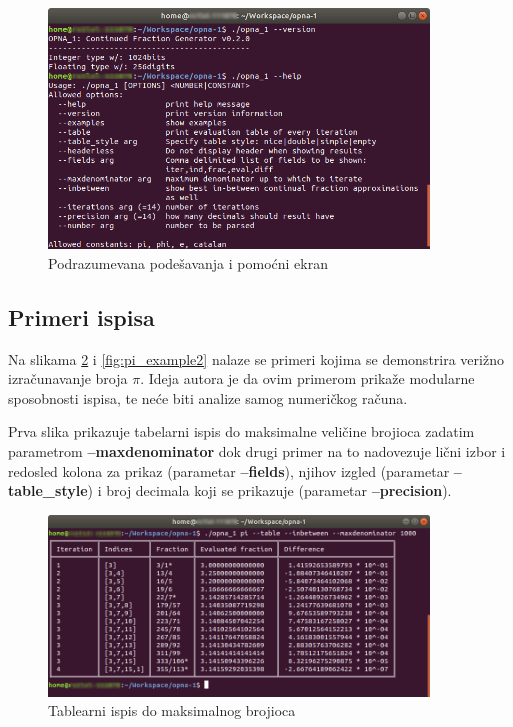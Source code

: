 \documentclass[a4paper,10pt]{article}
\begin{document}
\begin{figure}
\begin{center}
\includegraphics[width=0.9\textwidth]{version.png}
\caption{Podrazumevana podešavanja i pomoćni ekran}
\label{fig:version}
\end{center}
\end{figure}

\subsection{Primeri ispisa}

Na slikama \ref{fig:pi_example1} i \ref{fig:pi_example2} nalaze se primeri kojima se demonstrira verižno izračunavanje broja $\pi$. 
Ideja autora je da ovim primerom prikaže modularne sposobnosti ispisa, te neće biti analize samog numeričkog računa. 


Prva slika prikazuje tabelarni ispis do maksimalne veličine brojioca zadatim parametrom \textbf{--maxdenominator} dok drugi primer na to nadovezuje lični izbor i redosled kolona za prikaz (parametar \textbf{--fields}), njihov izgled (parametar \textbf{--table\_style}) i broj decimala koji se prikazuje (parametar \textbf{--precision}).

\begin{figure}
\begin{center}
\includegraphics[width=0.9\textwidth]{pi_example1.png}
\caption{Tablearni ispis do maksimalnog brojioca}
\label{fig:pi_example1}
\end{center}
\end{figure}
\end{document}
